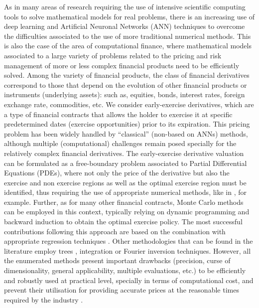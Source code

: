     As in many areas of research requiring the use of intensive scientific computing tools to solve mathematical models for real problems, there is an increasing use of deep learning and Artificial Neuronal Networks (ANN) techniques to overcome the difficulties associated to the use of more traditional numerical methods. This is also the case of the area of computational finance, where mathematical models associated to a large variety of problems related to the pricing and risk management of more or less complex financial products need to be efficiently solved. Among the variety of financial products, the class of financial derivatives correspond to those that depend on the evolution of other financial products or instruments (underlying assets): such as, equities, bonds, interest rates, foreign exchange rate, commodities, etc. We consider early-exercise derivatives, which are a type of financial contracts that allows the holder to exercise it at specific predetermined dates (exercise opportunities) prior to its expiration. This pricing problem has been widely handled by ``classical'' (non-based on ANNs) methods, although multiple (computational) challenges remain posed specially for the relatively complex financial derivatives. The early-exercise derivative valuation can be formulated as a free-boundary problem associated to Partial Differential Equations (PDEs), where not only the price of the derivative but also the exercise and non exercise regions as well as the optimal exercise region must be identified, thus requiring the use of appropriate numerical methods, like in \cite{Jaillet, Carlos_98, forsyth_amer, BerNogVaz_2006, FarVaz_2005, ASV-2020}, for example. Further, as for many other financial contracts, Monte Carlo methods can be employed in this context, typically relying on dynamic programming and backward induction to obtain the optimal exercise policy. The most successful contributions following this approach are based on the combination with appropriate regression techniques \cite{longstaff2001, jain2015, leitao2015, jain2019, ASV-MC1-2019, arregui2023}. Other methodologies that can be found in the literature employ trees \cite{echchafiq2023}, integration \cite{hagan2004, zhu2018} or Fourier inversion \cite{fang2009} techniques. However, all the enumerated methods present important drawbacks (precision, curse of dimensionality, general applicability, multiple evaluations, etc.) to be efficiently and robustly used at practical level, specially in terms of computational cost, and prevent their utilisation for providing accurate prices at the reasonable times required by the industry \cite{huge2020, ebner2022}.
    
